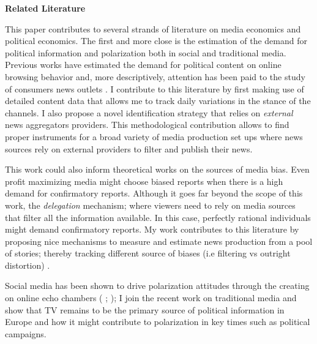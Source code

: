 \documentclass[12pt]{article}
\begin{document}


\textbf{Related Literature}
	
	
	This paper contributes to several strands of literature on media economics and political economics. The first and more close is the estimation of the demand for political information and polarization both in social and traditional media. Previous works have estimated the demand for political content on online browsing behavior \citep{SimonovRao2022} and, more descriptively, attention has been paid to the study of consumers news outlets  \citep{peterson2018echo} \citep{gambaro2021revealed}. I contribute to this literature by first making use of detailed content data that allows me to track daily variations in the stance of the channels. I also propose a novel identification strategy that relies on \textit{external} news aggregators providers. This methodological contribution allows to find proper instruments for a broad variety of media production set ups where news sources rely on external providers to filter and publish their news. 
	
This work could also inform theoretical works on the sources of media bias.  Even profit maximizing media might choose biased reports when there is a high demand for confirmatory reports. Although it goes far beyond the scope of this work, the \textit{delegation} mechanism; where viewers need to rely on media sources that filter all the information available. In this case, perfectly rational individuals might demand confirmatory reports. My work contributes to this literature by proposing nice mechanisms to measure and estimate news production from a pool of stories; thereby tracking different source of biases (i.e filtering vs outright distortion) \citep{gentzkow2014media}.
	

	
Social media has been shown to drive polarization attitudes  through the creating on online echo chambers (\cite{bail2018exposure} ; \cite{Zhuravskaya2020} ); I join the recent work on traditional media \citep{schneider2025media} and show that TV remains to be the primary source of political information in Europe and how it might contribute to polarization in key times such as political campaigns. 
	
\end{document}
